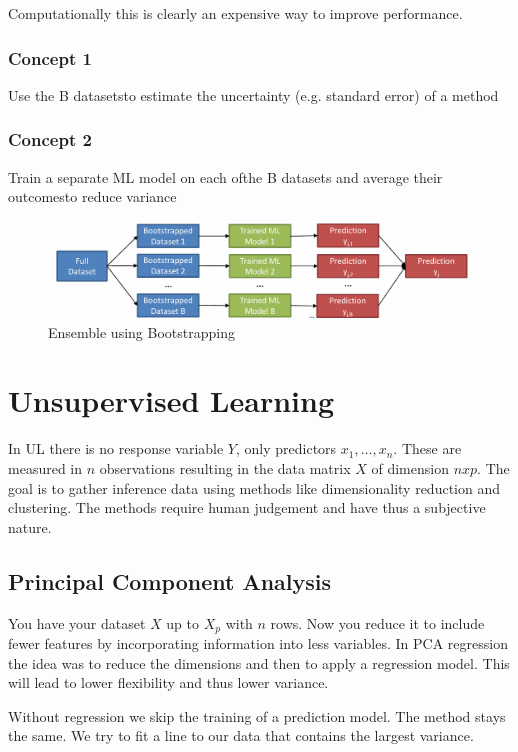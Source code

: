 \documentclass[../Main.tex]{subfiles}
\begin{document}
Computationally this is clearly an 
expensive way to improve 
performance.

\subsubsection{Concept 1} Use the B datasetsto
 estimate the uncertainty (e.g.
 standard error) of a method
\subsubsection{Concept 2} Train a separate ML model on each ofthe B datasets and 
average their outcomesto reduce variance

\begin{figure}[H]
    \centering
    \includegraphics[width=1\linewidth]{Images/bootstrapping-ensemble.png}
    \caption{Ensemble using Bootstrapping}
\end{figure}

\newpage
\section{Unsupervised Learning}
In UL there is no response variable \(Y\), only
predictors \(x_1,\dots ,x_n\). These are measured in
\(n\) observations resulting in the data matrix \(X\)
of dimension \(nxp\). The goal is to gather
inference data using methods like dimensionality reduction
and clustering. The methods require human judgement and have
thus a subjective nature.
\subsection{Principal Component Analysis}
You have your dataset \(X\) up to \(X_p\) with \(n\) rows.
Now you reduce it to include fewer features by incorporating
information into less variables. In PCA regression the idea
was to reduce the dimensions and then to apply a regression model.
This will lead to lower flexibility and thus lower variance.

Without regression we skip the training of a prediction model.
The method stays the same. We try to fit a line to our data
that contains the largest variance.
\end{document}
